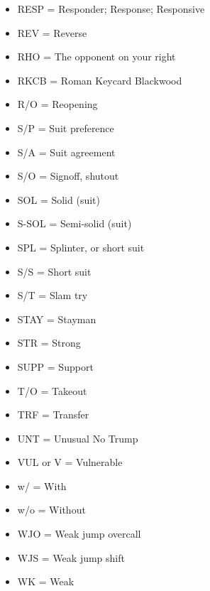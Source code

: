 \documentclass[a4paper]{article}
\begin{document}
\begin{itemize}
\item RESP         = Responder; Response; Responsive

\item REV          = Reverse

\item RHO          = The opponent on your right

\item RKCB         = Roman Keycard Blackwood

\item R/O          = Reopening

\item S/P          = Suit preference

\item S/A          = Suit agreement

\item S/O          = Signoff, shutout

\item SOL          = Solid (suit)

\item S-SOL        = Semi-solid (suit)

\item SPL          = Splinter, or short suit

\item S/S          = Short suit

\item S/T          = Slam try

\item STAY         = Stayman

\item STR          = Strong

\item SUPP         = Support

\item T/O          = Takeout

\item TRF          = Transfer

\item UNT          = Unusual No Trump

\item VUL or V     = Vulnerable

\item w/           = With

\item w/o          = Without

\item WJO          = Weak jump overcall

\item WJS          = Weak jump shift

\item WK           = Weak

\end{itemize}
\end{document}
